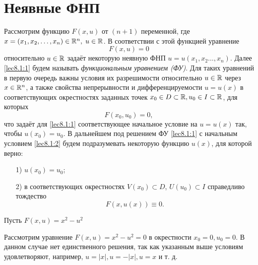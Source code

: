 \documentclass[../../main.tex]{subfiles}
\begin{document}
	\section{Неявные ФНП}

	Рассмотрим функцию $F(x, u)$ от $(n+1)$ переменной, где $x = (x_1, x_2, 
	\ldots,  x_n) \in \mathbb{R}^n, \; u \in \mathbb{R}$. В соответствии с этой функцией уравнение
	 \begin{equation}
		F(x,u) = 0 \label{lec8.1:1}
	 \end{equation}
	 относительно $u \in \mathbb{R}$ задаёт некоторую неявную ФНП $u = u(x_1, x_2 
	 \ldots, x_n)$. Далее \eqref{lec8.1:1} будем называть \emph{функциональным 
	 уравнением (ФУ)}. Для таких уравнений в первую очередь важны условия их 
	 разрешимости относительно $u \in \mathbb{R}$ через $x \in \mathbb{R}^n$, а также свойства 
	 непрерывности и дифференцируемости $u = u(x)$ в соответствующих 
	 окрестностях заданных точек $x_0 \in D \subset \mathbb{R}, u_0 \in I  \subset \mathbb{R}$, 
	 для которых
	 \begin{equation}
		F(x_0, u_0) = 0, \label{lec8.1:2}
	 \end{equation}
	 что задаёт для \eqref{lec8.1:1} соответствующее начальное условие на $u = 
	 u(x)$ так, чтобы $u(x_0) = u_0$. В дальнейшем под решением ФУ 
	 \eqref{lec8.1:1} с начальным условием \eqref{lec8.1:2} будем подразумевать 
	 некоторую функцию $u(x)$, для которой верно: 
	 \begin{itemize}
	 	\item[1)] $u(x_0) = u_0$;
	 	\item[2)] в соответствующих окрестностях $V(x_0) \subset D$, $U(u_0) 
	 	\subset I$ справедливо тождество
		\begin{equation}
			F(x, u(x)) \equiv 0. \label{lec8.1:3}
		\end{equation}
	 \end{itemize}
	 \begin{exmp}
		Пусть $F(x, u) = x^2 - u^2$

		Рассмотрим уравнение $F(x, u) = x^2 - u^2 = 0$ в окрестности $x_0=0, 
		u_0=0$. В данном случае нет единственного решения, так как указанным 
		выше условиям удовлетворяют, например, $u=|x|, u=-|x|, u = x$  и т. д.
	 \end{exmp}
\end{document}
